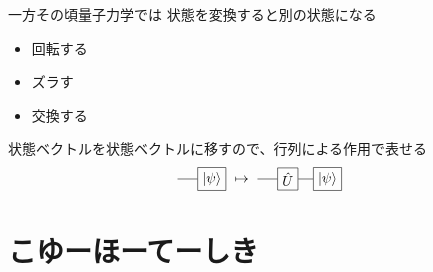 \documentclass[dvipdfm]{beamer}
\begin{document}
\begin{frame}{一方その頃量子力学では}
    状態を変換すると別の状態になる
    \begin{itemize}
        \item 回転する
        \item ズラす
        \item 交換する
    \end{itemize}
    状態ベクトルを状態ベクトルに移すので、行列による作用で表せる
    \begin{equation*}
        \vcenter{\hbox{
            \begin{tikzpicture}
                \node at(1,0)[draw, rectangle](psi){$\ket{\psi}$};
                \draw(psi.west)--++(-.5,0);
            \end{tikzpicture}
        }}
        \mapsto
        \vcenter{\hbox{
            \begin{tikzpicture}
                \node at(0,0)[draw, rectangle](H){$\hat{U}$};
                \node at(1,0)[draw, rectangle](psi){$\ket{\psi}$};
                \draw(H.east)--(psi.west)(H.west)--++(-.5,0);
            \end{tikzpicture}
        }}
    \end{equation*}
\end{frame}


\section{こゆーほーてーしき}
\end{document}
